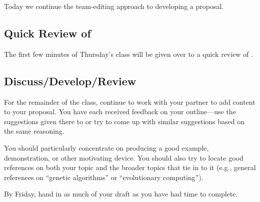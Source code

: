 
\usepackage{ulem}
\usepackage[compact]{titlesec}




Today we continue the team-editing approach to developing a proposal.

\subsection*{Quick Review of \BibTeX}

The first few minutes of Thursday's class will be given over to a quick review
of \BibTeX.

\subsection*{Discuss/Develop/Review}
For the remainder of the class, continue to work with your partner to add
content to your proposal. You have each received feedback on your 
outline---use the suggestions given there to or try to come up with similar
suggestions based on the same reasoning.

You should particularly concentrate on producing a good 
example, demonstration, or other motivating device. You should also 
try to locate good references on both your topic and the broader
topics that tie in to it (e.g., general references on ``genetic algorithms''
or ``evolutionary computing'').

By Friday, hand in as much of your draft as you have had time to complete.



